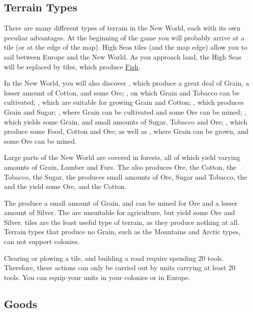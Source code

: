 \documentclass[12pt]{article}
\begin{document}
\hypertarget{Terrain Types}{\subsection{Terrain Types}}

There are many different types of terrain in the New World, each with
its own peculiar advantages. At the beginning of the game you will
probably arrive at a  tile (or at the edge of the
map). High Seas tiles (and the map edge) allow you to sail between
Europe and the New World. As you approach land, the High Seas will be
replaced by  tiles, which produce
\hyperlink{Fish}{Fish}.

In the New World, you will also discover , which
produce a great deal of Grain, a lesser amount of Cotton, and some
Ore; , on which Grain and Tobacco can be
cultivated; , which are suitable for growing Grain
and Cotton; , which produces Grain and Sugar;
, where Grain can be cultivated and some Ore can be
mined; , which yields some Grain, and small amounts of
Sugar, Tobacco and Ore; , which produce some Food,
Cotton and Ore; as well as , where Grain can be grown,
and some Ore can be mined.

Large parts of the New World are covered in forests, all of which
yield varying amounts of Grain, Lumber and Furs. The  also produces Ore, the  Cotton, the
 Tobacco, the  Sugar,
the  produces small amounts of Ore, Sugar and
Tobacco, the  and the 
yield some Ore, and the  Cotton.

The  produce a small amount of Grain, and can be mined
for Ore and a lesser amount of Silver. The  are
unsuitable for agriculture, but yield some Ore and Silver.
 tiles are the least useful type of terrain, as they
produce nothing at all. Terrain types that produce no Grain, such as
the Mountains and Arctic types, can not support colonies.

Clearing or plowing a tile, and building a road require spending 20
tools. Therefore, these actions can only be carried out by units
carrying at least 20 tools. You can equip your units in your colonies
or in Europe.

\hypertarget{Goods}{\subsection{Goods}}
\end{document}
